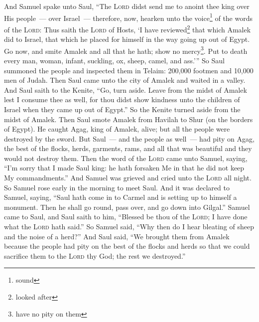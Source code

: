 

\begin{enumerate*}[mode=unboxed]
     And Samuel spake unto Saul, ``The \textsc{Lord} didst send me to anoint thee king over His people~--- over Israel~--- therefore, now, hearken unto the voice\footnote{sound} of the words of the \textsc{Lord}:%
     Thus saith the \textsc{Lord} of Hosts, `I have reviewed\footnote{looked after} that which Amalek did to Israel, that which he placed for himself in the way going up out of Egypt.%
     Go now, and smite Amalek and all that he hath; show no mercy\footnote{have no pity on them}. Put to death every man, woman, infant, suckling, ox, sheep, camel, and ass.'''%
     So Saul summoned the people and inspected them in Telaim: 200,000 footmen and 10,000 men of Judah.%
     Then Saul came unto the city of Amalek and waited in a valley.%
     And Saul saith to the Kenite, ``Go, turn aside. Leave from the midst of Amalek lest I consume thee as well, for thou didst show kindness unto the children of Israel when they came up out of Egypt.'' So the Kenite turned aside from the midst of Amalek.%
     Then Saul smote Amalek from Havilah to Shur (on the borders of Egypt).%
     He caught Agag, king of Amalek, alive; but all the people were destroyed by the sword.%
     But Saul~--- and the people as well~--- had pity on Agag, the best of the flocks, herds, garments, rams, and all that was beautiful and they would not destroy them.%
     Then the word of the \textsc{Lord} came unto Samuel, saying,%
     ``I'm sorry that I made Saul king: he hath forsaken Me in that he did not keep My commandments.'' And Samuel was grieved and cried unto the \textsc{Lord} all night.%
     So Samuel rose early in the morning to meet Saul. And it was declared to Samuel, saying, ``Saul hath come in to Carmel and is setting up to himself a monument. Then he shall go round, pass over, and go down into Gilgal.''%
     Samuel came to Saul, and Saul saith to him, ``Blessed be thou of the \textsc{Lord}; I have done what the \textsc{Lord} hath said.''%
     So Samuel said, ``Why then do I hear bleating of sheep and the noise of a herd?''%
     And Saul said, ``We brought them from Amalek because the people had pity on the best of the flocks and herds so that we could sacrifice them to the \textsc{Lord} thy God; the rest we destroyed.''%

\end{enumerate*}
